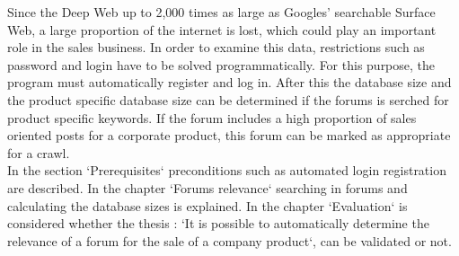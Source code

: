 Since the Deep Web up to 2,000 times as large as Googles' searchable Surface Web, a large proportion of the internet is lost, which could play an important role in the sales business.
In order to examine this data, restrictions such as password and login have to be solved programmatically. For this purpose, the program must automatically register and log in. After this the database size and the product specific database size can be determined if the forums is serched for product specific keywords. If the forum includes a high proportion of sales oriented posts for a corporate product, this forum can be marked as appropriate for a crawl. \\
In the section `Prerequisites` preconditions such as automated login registration are described. In the chapter `Forums relevance` searching in forums and calculating the database sizes is explained. In the chapter `Evaluation` is considered whether the thesis : `It is possible to automatically determine the relevance of a forum for the sale of a company product`, can be validated or not.
\newpage